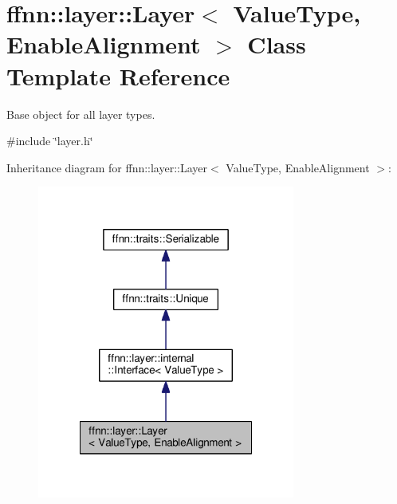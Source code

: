 \hypertarget{classffnn_1_1layer_1_1_layer}{\section{ffnn\-:\-:layer\-:\-:Layer$<$ Value\-Type, Enable\-Alignment $>$ Class Template Reference}
\label{classffnn_1_1layer_1_1_layer}
}


Base object for all layer types.  




{\ttfamily \#include \char`\"{}layer.\-h\char`\"{}}



Inheritance diagram for ffnn\-:\-:layer\-:\-:Layer$<$ Value\-Type, Enable\-Alignment $>$\-:
\nopagebreak
\begin{figure}[H]
\begin{center}
\leavevmode
\includegraphics[width=240pt]{classffnn_1_1layer_1_1_layer__inherit__graph}
\end{center}
\end{figure}


